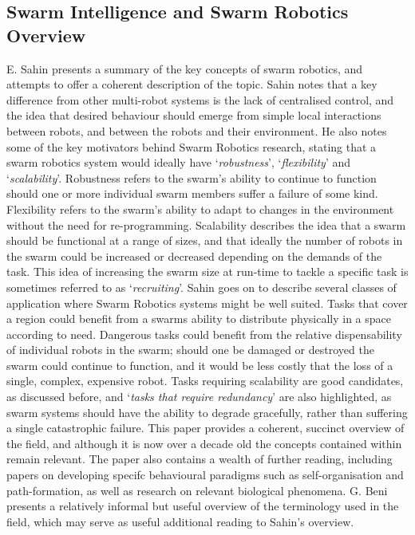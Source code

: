 \documentclass[titlepage,hidelinks,10pt]{article}
\begin{document}
\subsection{Swarm Intelligence and Swarm Robotics Overview} \label{GeneralSR}
E. Sahin presents a summary of the key concepts of swarm robotics, and attempts to offer a coherent description of the topic\cite{InspirationToApplication}. Sahin notes that a key difference from other multi-robot systems is the lack of centralised control, and the idea that desired behaviour should emerge from simple local interactions between robots, and between the robots and their environment. He also notes some of the key motivators behind Swarm Robotics research, stating that a swarm robotics system would ideally have `\textit{robustness}', `\textit{flexibility}' and `\textit{scalability}'. Robustness refers to the swarm's ability to continue to function should one or more individual swarm members suffer a failure of some kind. Flexibility refers to the swarm's ability to adapt to changes in the environment without the need for re-programming. Scalability describes the idea that a swarm should be functional at a range of sizes, and that ideally the number of robots in the swarm could be increased or decreased depending on the demands of the task. This idea of increasing the swarm size at run-time to tackle a specific task is sometimes referred to as `\textit{recruiting}'\cite{Recruiting}. Sahin goes on to describe several classes of application where Swarm Robotics systems might be well suited. Tasks that cover a region could benefit from a swarms ability to distribute physically in a space according to need. Dangerous tasks could benefit from the relative dispensability of individual robots in the swarm; should one be damaged or destroyed the swarm could continue to function, and it would be less costly that the loss of a single, complex, expensive robot. Tasks requiring scalability are good candidates, as discussed before, and `\textit{tasks that require redundancy}' are also highlighted, as swarm systems should have the ability to degrade gracefully, rather than suffering a single catastrophic failure. This paper provides a coherent, succinct overview of the field, and although it is now over a decade old the concepts contained within remain relevant. The paper also contains a wealth of further reading, including papers on developing specifc behavioural paradigms such as self-organisation\cite{SelfOrganizing} and path-formation\cite{PathFormation}, as well as research on relevant biological phenomena\cite{BacterialSelfOrganization}. G. Beni presents a relatively informal but useful overview of the terminology used in the field\cite{FromSIToSR}, which may serve as useful additional reading to Sahin's overview.
\end{document}
